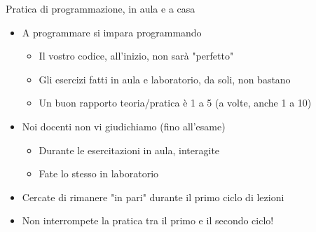 \begin{frame}{Pratica di programmazione, in aula e a casa}

  \begin{itemize}
  \item A programmare si impara programmando
  \begin{itemize}
    \item Il vostro codice, all'inizio, non sarà "perfetto"
    \item Gli esercizi fatti in aula e laboratorio, da soli, non bastano
    \item Un buon rapporto teoria/pratica è 1 a 5 (a volte, anche 1 a 10)
  \end{itemize}
  \item Noi docenti non vi giudichiamo (fino all'esame)
  \begin{itemize}
    \item Durante le esercitazioni in aula, interagite
    \item Fate lo stesso in laboratorio
  \end{itemize}
  \item Cercate di rimanere "in pari" durante il primo ciclo di lezioni
  \item Non interrompete la pratica tra il primo e il secondo ciclo!
  \end{itemize}

\end{frame}

